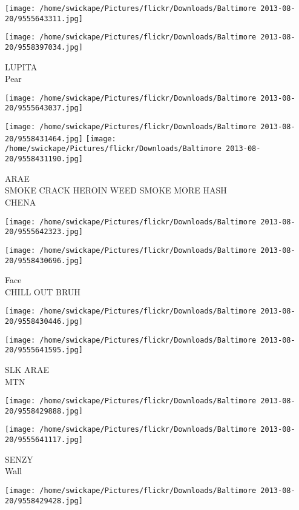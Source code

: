 \documentclass[10pt,letterpaper]{article}
\begin{document}
\texttt{[image: /home/swickape/Pictures/flickr/Downloads/Baltimore 2013-08-20/9555643311.jpg]}

\vspace{0.25in}
\texttt{[image: /home/swickape/Pictures/flickr/Downloads/Baltimore 2013-08-20/9558397034.jpg]}

LUPITA\\
Pear
\pagebreak

\texttt{[image: /home/swickape/Pictures/flickr/Downloads/Baltimore 2013-08-20/9555643037.jpg]}

\vspace{0.25in}
\texttt{[image: /home/swickape/Pictures/flickr/Downloads/Baltimore 2013-08-20/9558431464.jpg]}
\texttt{[image: /home/swickape/Pictures/flickr/Downloads/Baltimore 2013-08-20/9558431190.jpg]}

ARAE\\
SMOKE CRACK HEROIN WEED SMOKE MORE HASH\\
CHENA
\pagebreak

\texttt{[image: /home/swickape/Pictures/flickr/Downloads/Baltimore 2013-08-20/9555642323.jpg]}

\vspace{0.25in}
\texttt{[image: /home/swickape/Pictures/flickr/Downloads/Baltimore 2013-08-20/9558430696.jpg]}

Face\\
CHILL OUT BRUH
\pagebreak

\texttt{[image: /home/swickape/Pictures/flickr/Downloads/Baltimore 2013-08-20/9558430446.jpg]}

\vspace{0.25in}
\texttt{[image: /home/swickape/Pictures/flickr/Downloads/Baltimore 2013-08-20/9555641595.jpg]}

SLK ARAE\\
MTN
\pagebreak

\texttt{[image: /home/swickape/Pictures/flickr/Downloads/Baltimore 2013-08-20/9558429888.jpg]}

\vspace{0.25in}
\texttt{[image: /home/swickape/Pictures/flickr/Downloads/Baltimore 2013-08-20/9555641117.jpg]}

SENZY\\
Wall
\pagebreak

\texttt{[image: /home/swickape/Pictures/flickr/Downloads/Baltimore 2013-08-20/9558429428.jpg]}
\end{document}
